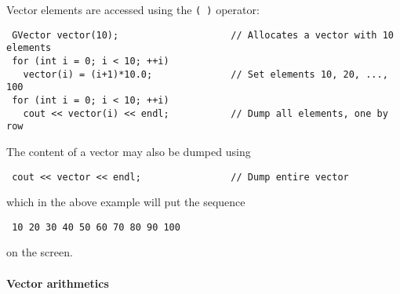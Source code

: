 \documentclass{article}[12pt,a4]
\begin{document}
Vector elements are accessed using the {\tt ( )} operator:
\begin{verbatim}
 GVector vector(10);                    // Allocates a vector with 10 elements
 for (int i = 0; i < 10; ++i)
   vector(i) = (i+1)*10.0;              // Set elements 10, 20, ..., 100
 for (int i = 0; i < 10; ++i)
   cout << vector(i) << endl;           // Dump all elements, one by row 
\end{verbatim}
The content of a vector may also be dumped using
\begin{verbatim}
 cout << vector << endl;                // Dump entire vector
\end{verbatim}
which in the above example will put the sequence
\begin{verbatim}
 10 20 30 40 50 60 70 80 90 100
\end{verbatim}
on the screen.


\paragraph{Vector arithmetics}
\end{document}

